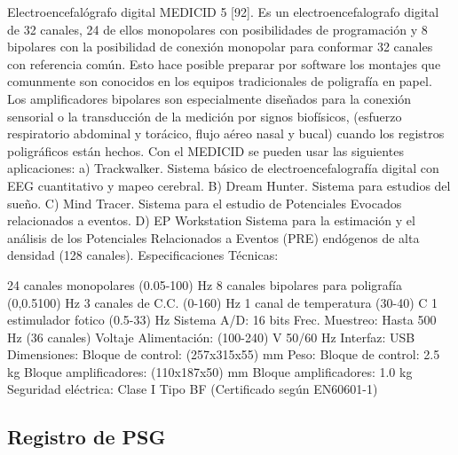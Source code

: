 Electroencefalógrafo digital MEDICID 5 [92]. Es un electroencefalografo digital de 32 canales, 24 de ellos monopolares con posibilidades de programación y 8 bipolares con la posibilidad de conexión monopolar para conformar 32 canales con referencia común. Esto hace posible preparar por software los montajes que comunmente son conocidos en los equipos tradicionales de poligrafía en papel. Los amplificadores bipolares son especialmente diseñados para la conexión sensorial o la transducción de la medición por signos biofísicos, (esfuerzo respiratorio abdominal y torácico, flujo aéreo nasal y bucal) cuando los registros poligráficos están hechos. Con el MEDICID se pueden usar las siguientes aplicaciones: a) Trackwalker. Sistema básico de electroencefalografía digital con EEG cuantitativo y mapeo cerebral. B) Dream Hunter. Sistema para estudios del sueño. C) Mind Tracer. Sistema para el estudio de Potenciales Evocados relacionados a eventos. D) EP Workstation Sistema para la estimación y el análisis de los Potenciales Relacionados a Eventos (PRE) endógenos de alta densidad (128 canales). Especificaciones Técnicas:

24 canales monopolares (0.05-100) Hz
8 canales bipolares para poligrafía (0,0.5100) Hz
3 canales de C.C. (0-160) Hz
1 canal de temperatura (30-40) C
1 estimulador fotico (0.5-33) Hz
Sistema A/D: 16 bits
Frec. Muestreo: Hasta 500 Hz (36 canales)
Voltaje Alimentación: (100-240) V 50/60 Hz
Interfaz: USB
Dimensiones: Bloque de control: (257x315x55) mm
Peso: Bloque de control: 2.5 kg
Bloque amplificadores: (110x187x50) mm
Bloque amplificadores: 1.0 kg
Seguridad eléctrica: Clase I Tipo BF (Certificado según EN60601-1)

\subsection{Registro de PSG}

